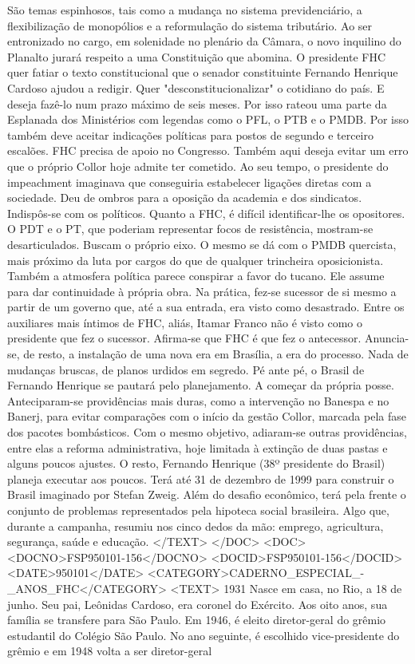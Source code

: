 São temas espinhosos, tais como a mudança no sistema previdenciário, a flexibilização de monopólios e a reformulação do sistema tributário. Ao ser entronizado no cargo, em solenidade no plenário da Câmara, o novo inquilino do Planalto jurará respeito a uma Constituição que abomina.
O presidente FHC quer fatiar o texto constitucional que o senador constituinte Fernando Henrique Cardoso ajudou a redigir. Quer "desconstitucionalizar" o cotidiano do país. E deseja fazê-lo num prazo máximo de seis meses.
Por isso rateou uma parte da Esplanada dos Ministérios com legendas como o PFL, o PTB e o PMDB. Por isso também deve aceitar indicações políticas para postos de segundo e terceiro escalões. FHC precisa de apoio no Congresso. Também aqui deseja evitar um erro que o próprio Collor hoje admite ter cometido.
Ao seu tempo, o presidente do impeachment imaginava que conseguiria estabelecer ligações diretas com a sociedade. Deu de ombros para a oposição da academia e dos sindicatos. Indispôs-se com os políticos. Quanto a FHC, é difícil identificar-lhe os opositores. O PDT e o PT, que poderiam representar focos de resistência, mostram-se desarticulados. Buscam o próprio eixo. O mesmo se dá com o PMDB quercista, mais próximo da luta por cargos do que de qualquer trincheira oposicionista.
Também a atmosfera política parece conspirar a favor do tucano. Ele assume para dar continuidade à própria obra. Na prática, fez-se sucessor de si mesmo a partir de um governo que, até a sua entrada, era visto como desastrado. Entre os auxiliares mais íntimos de FHC, aliás, Itamar Franco não é visto como o presidente que fez o sucessor. Afirma-se que FHC é que fez o antecessor.
Anuncia-se, de resto, a instalação de uma nova era em Brasília, a era do processo. Nada de mudanças bruscas, de planos urdidos em segredo. Pé ante pé, o Brasil de Fernando Henrique se pautará pelo planejamento. A começar da própria posse. Anteciparam-se providências mais duras, como a intervenção no Banespa e no Banerj, para evitar comparações com o início da gestão Collor, marcada pela fase dos pacotes bombásticos.
Com o mesmo objetivo, adiaram-se outras providências, entre elas a reforma administrativa, hoje limitada à extinção de duas pastas e alguns poucos ajustes. O resto, Fernando Henrique (38º presidente do Brasil) planeja executar aos poucos. Terá até 31 de dezembro de 1999 para construir o Brasil imaginado por Stefan Zweig.
Além do desafio econômico, terá pela frente o conjunto de problemas representados pela hipoteca social brasileira. Algo que, durante a campanha, resumiu nos cinco dedos da mão: emprego, agricultura, segurança, saúde e educação.
</TEXT>
</DOC>
<DOC>
<DOCNO>FSP950101-156</DOCNO>
<DOCID>FSP950101-156</DOCID>
<DATE>950101</DATE>
<CATEGORY>CADERNO_ESPECIAL_-_ANOS_FHC</CATEGORY>
<TEXT>
1931
Nasce em casa,  no Rio,  a  18 de junho. Seu pai, Leônidas Cardoso, era coronel do Exército. Aos oito anos, sua família se transfere para São Paulo. Em 1946, é eleito diretor-geral do grêmio estudantil do Colégio São Paulo. No ano seguinte, é escolhido vice-presidente do grêmio e em 1948 volta a ser diretor-geral


